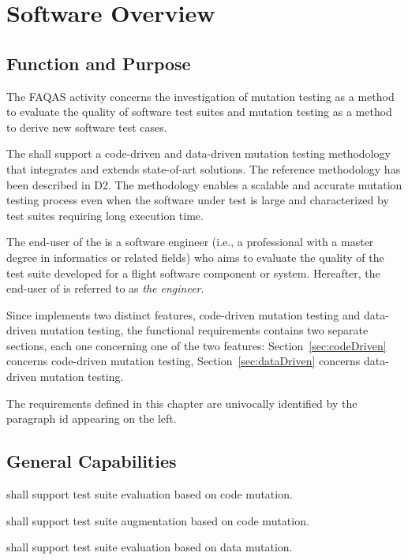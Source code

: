 
\chapter{Software Overview}
\label{chapter:overview}

\section{Function and Purpose}

The FAQAS activity concerns the investigation of mutation testing as a method to evaluate the quality of software test suites and mutation testing as a method to derive new software test cases. 

The \FAQAS shall support a code-driven and data-driven mutation testing methodology that integrates and extends state-of-art solutions. The reference methodology has been described in D2. The methodology enables a scalable and accurate mutation testing process even when the software under test is large and characterized by test suites requiring long execution time.

The end-user of the \FAQAS is a software engineer (i.e., a professional with a master degree in informatics or related fields)  who aims to evaluate the quality of the test suite developed for a flight software component or system. Hereafter, the end-user of \FAQAS is referred to as \emph{the engineer}.

Since \FAQAS implements two distinct features, code-driven mutation testing and data-driven mutation testing, the functional requirements contains two separate sections, each one concerning one of the two features: Section~\ref{sec:codeDriven} concerns code-driven mutation testing, Section~\ref{sec:dataDriven} concerns data-driven mutation testing.

The requirements defined in this chapter are univocally identified by the paragraph id appearing on the left.

\section{General Capabilities}

\RQ{} \FAQAS shall support test suite evaluation based on code mutation.

\RQ{} \FAQAS shall support test suite augmentation based on code mutation.

\RQ{} \FAQAS shall support test suite evaluation based on data mutation.


